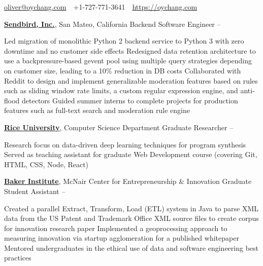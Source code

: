 \documentclass[letterpaper,MMMyyyy,nonstopmode]{simpleresumecv}
\newcommand{\CVAuthor}{Oliver Chang}
\newcommand{\CVWebpage}{https://oychang.com}
\begin{document}

\Title{\CVAuthor}

\begin{SubTitle}
\href{mailto:oliver@oychang.com}{oliver@oychang.com}
\,\SubBulletSymbol\,
+1-727-771-3641
\,\SubBulletSymbol\,
\href{\CVWebpage}
{\url{\CVWebpage}}
\end{SubTitle}

\begin{Body}




\Entry
\href{https://www.sendbird.com/}{\textbf{Sendbird, Inc.}}, San Mateo, California
\Gap
\BulletItem Backend Software Engineer
\hfill {} -- 
\begin{Detail}
\SubBulletItem Led migration of monolithic Python 2 backend service to Python 3 with zero downtime and no customer side effects
\SubBulletItem Redesigned data retention architecture to use a backpressure-based gevent pool using multiple query strategies depending on customer size, leading to a 10\% reduction in DB costs
\SubBulletItem Collaborated with Reddit to design and implement generalizable moderation features based on rules such as sliding window rate limits, a custom regular expression engine, and anti-flood detectors
\SubBulletItem Guided summer interns to complete projects for production features such as full-text search and moderation rule engine
\end{Detail}

\Entry
\href{http://www.rice.edu/}{\textbf{Rice University}}, Computer Science Department
\Gap
\BulletItem Graduate Researcher
\hfill {} -- 
\begin{Detail}
\SubBulletItem Research focus on data-driven deep learning techniques for program synthesis
\SubBulletItem Served as teaching assistant for graduate Web Development course (covering Git, HTML, CSS, Node, React)
\end{Detail}

\Entry
\href{http://www.rice.edu/}{\textbf{Baker Institute}}, McNair Center for Entrepreneurship \& Innovation
\Gap
\BulletItem Graduate Student Assistant
\hfill {} -- 
\begin{Detail}
\SubBulletItem Created a parallel Extract, Transform, Load (ETL) system in Java to parse XML data from the US Patent and Trademark Office XML source files to create corpus for innovation research paper
\SubBulletItem Implemented a geoprocessing approach to measuring innovation via startup agglomeration for a published whitepaper
\SubBulletItem Mentored undergraduates in the ethical use of data and software engineering best practices
\end{Detail}


\end{Body}
\end{document}
